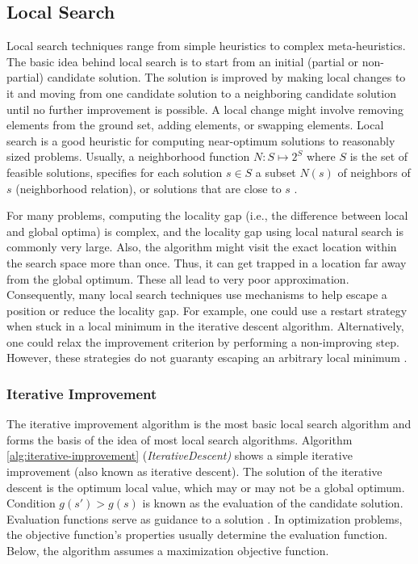 \subsection{Local Search}
Local search techniques range from simple heuristics to complex meta-heuristics. The basic idea behind local search is to start from an initial (partial or non-partial) \gls{candidate solution}. The solution is improved by making local changes to it and moving from one \gls{candidate solution} to a neighboring \gls{candidate solution} until no further improvement is possible. A local change might involve removing elements from the ground set, adding elements, or swapping elements. Local search is a good heuristic for computing near-optimum solutions to reasonably sized problems. Usually, a neighborhood function $N: S \mapsto 2^S$ where $S $ is the set of feasible solutions, specifies for each solution $s \in S$ a subset $N(s)$ of neighbors of $s$ (neighborhood relation), or solutions that are close to $s$ \parencite{Gonzalez2007HandbookMetaheuristics}.

For many problems, computing the locality gap (i.e., the difference between local and global optima) is complex, and the locality gap using local natural search is commonly very large. Also, the algorithm might visit the exact location within the search space more than once. Thus, it can get trapped in a location far away from the global optimum. These all lead to very poor approximation. Consequently, many local search techniques use mechanisms to help escape a position or reduce the locality gap. For example, one could use a restart strategy when stuck in a local minimum in the iterative descent algorithm. Alternatively, one could relax the improvement criterion by performing a non-improving step. However, these strategies do not guaranty escaping an arbitrary local minimum \parencite{HolgerH2013StochasticApplications}.


\subsubsection{Iterative Improvement}
The iterative improvement algorithm is the most basic local search algorithm and forms the basis of the idea of most local search algorithms. Algorithm \ref{alg:iterative-improvement} (\textit{IterativeDescent)} shows a simple iterative improvement (also known as iterative descent). The solution of the iterative descent is the optimum local value, which may or may not be a global optimum. Condition $g(s') > g(s)$ is known as the evaluation of the candidate solution. Evaluation functions serve as guidance to a solution \parencite{HolgerH2013StochasticApplications}. In optimization problems, the objective function's properties usually determine the evaluation function. Below, the algorithm assumes a maximization objective function. 

